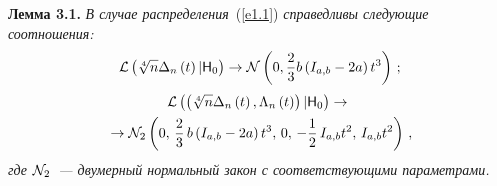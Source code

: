 \begin{multicols}{2}
\smallskip

\noindent
\textbf{Лемма 3.1.} {\it В случае распределения}~(\ref{e1.1}) {\it справедливы
следующие соотношения:
$$
{\cal L}\left(\sqrt[{4}]{n}\Delta_{n}\left(t\right)|{\sf H}_{0}
\right)\to {\cal N}\left(0,\displaystyle\frac{\displaystyle 2\mathstrut}{\displaystyle 3\mathstrut}b \left(I_{a,b} - 2a\right)t^{3} \right)\,;
$$
\begin{multline*}
{\cal L}\left(\left(\sqrt[{4}]{n}\Delta_{n}\left(t\right),\Lambda_{n}
\left(t\right)\right)|{\sf H}_{0}\right) \to{}\\
{}\to
 {\cal N}_{2}
\left(0, \,\displaystyle\frac{\displaystyle 2\mathstrut}{\displaystyle 3\mathstrut}\,b\left(I_{a,b} - 2a
\right)t^{3},\,0,\,-\displaystyle\frac{\displaystyle 1\mathstrut}{\displaystyle 2\mathstrut}\,I_{a,b}t^{2},\,I_{a,b}t^{2}\right)\,,
\end{multline*}
где ${\cal N}_2$~--- двумерный нормальный закон с соответствующими параметрами.}

\smallskip


\end{multicols}
